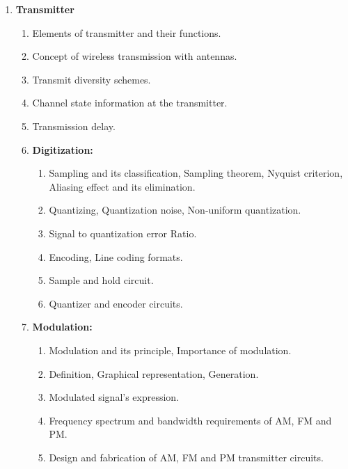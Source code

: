 \documentclass[12pt, a4paper]{article}
\newcommand{\hl}[1]{\colorbox{lgreen}{#1}}
\begin{document}
\begin{enumerate}
		\item \textbf{Transmitter}
		\begin{enumerate}[label*=\arabic*.]
			\item \hl{Elements of transmitter and their functions.}
			\item Concept of wireless transmission with antennas.
			\item Transmit diversity schemes.
			\item Channel state information at the transmitter.
			\item Transmission delay.
			\item \textbf{Digitization:}
			\begin{enumerate}[label*=\arabic*.]
			\item \hl{Sampling and its classification, Sampling theorem, Nyquist criterion,} \hl{Aliasing effect and its elimination.}
				\item \hl{Quantizing, Quantization noise, Non-uniform quantization.}
				\item \hl{Signal to quantization error Ratio.}
				\item \hl{Encoding, Line coding formats.}
				\item \hl{Sample and hold circuit.}
				\item \hl{Quantizer and encoder circuits.}
			\end{enumerate}
			\item \textbf{Modulation:}
			\begin{enumerate}[label*=\arabic*.]
				\item \hl{Modulation and its principle, Importance of modulation.}
				\item \hl{Definition, Graphical representation, Generation.}
				\item \hl{Modulated signal’s expression.}
				\item \hl{Frequency spectrum and bandwidth requirements of AM, FM and PM.}
				\item \hl{Design and fabrication of AM, FM and PM transmitter circuits.}
			\end{enumerate}
		\end{enumerate}
		

\end{enumerate}
\end{document}
